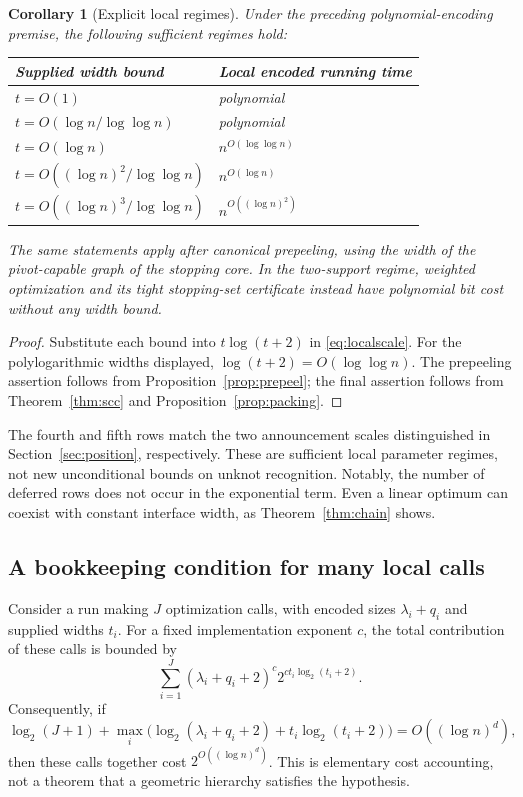 \documentclass[11pt]{article}
\newtheorem{corollary}[theorem]{Corollary}
\theoremstyle{definition}\newtheorem{definition}[theorem]{Definition}
\theoremstyle{remark}\newtheorem{remark}[theorem]{Remark}
\begin{document}
\begin{corollary}[Explicit local regimes]
\label{cor:regimes}
Under the preceding polynomial-encoding premise, the following sufficient regimes hold:
\begin{center}
\begin{tabular}{ll}
\toprule
Supplied width bound & Local encoded running time\\
\midrule
$t=O(1)$ & polynomial\\
$t=O(\log n/\log\log n)$ & polynomial\\
$t=O(\log n)$ & $n^{O(\log\log n)}$\\
$t=O((\log n)^2/\log\log n)$ & $n^{O(\log n)}$\\
$t=O((\log n)^3/\log\log n)$ & $n^{O((\log n)^2)}$\\
\bottomrule
\end{tabular}
\end{center}
The same statements apply after canonical prepeeling, using the width of the pivot-capable graph of the stopping core. In the two-support regime, weighted optimization and its tight stopping-set certificate instead have polynomial bit cost without any width bound.
\end{corollary}
\begin{proof}
Substitute each bound into $t\log(t+2)$ in \eqref{eq:localscale}. For the polylogarithmic widths displayed, $\log(t+2)=O(\log\log n)$. The prepeeling assertion follows from Proposition~\ref{prop:prepeel}; the final assertion follows from Theorem~\ref{thm:scc} and Proposition~\ref{prop:packing}.
\end{proof}

The fourth and fifth rows match the two announcement scales distinguished in Section~\ref{sec:position}, respectively. These are sufficient local parameter regimes, not new unconditional bounds on unknot recognition. Notably, the number of deferred rows does not occur in the exponential term. Even a linear optimum can coexist with constant interface width, as Theorem~\ref{thm:chain} shows.

\subsection{A bookkeeping condition for many local calls}
Consider a run making $J$ optimization calls, with encoded sizes $\lambda_i+q_i$ and supplied widths $t_i$. For a fixed implementation exponent $c$, the total contribution of these calls is bounded by
\begin{equation}
 \sum_{i=1}^J (\lambda_i+q_i+2)^c
       2^{c t_i\log_2(t_i+2)}.
 \label{eq:sumcalls}
\end{equation}
Consequently, if
\[
 \log_2(J+1)+\max_i\bigl(\log_2(\lambda_i+q_i+2)
                  +t_i\log_2(t_i+2)\bigr)
      =O((\log n)^d),
\]
then these calls together cost $2^{O((\log n)^d)}$. This is elementary cost accounting, not a theorem that a geometric hierarchy satisfies the hypothesis.
\end{document}
